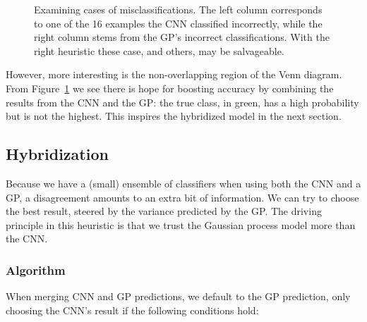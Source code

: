 \documentclass{article}
\begin{document}
\begin{figure}[htb]
\begin{minipage}[c]{.49\hsize}
\end{minipage} %
\caption{Examining cases of misclassifications. The left column corresponds to one of the 16 examples the CNN classified incorrectly, while the right column stems from the GP's incorrect classifications. With the right heuristic these case, and others, may be salvageable.}
\label{fig:mnist:mismatch}
\end{figure}

However, more interesting is the non-overlapping region of the Venn diagram. From Figure~\ref{fig:mnist:mismatch} we see there is hope for boosting accuracy by combining the results from the CNN and the GP: the true class, in green, has a high probability but is not the highest. This inspires the hybridized model in the next section.


\subsection{Hybridization}
\label{sec:mnist:hybridization}

Because we have a (small) ensemble of classifiers when using both the CNN and a GP, a disagreement amounts to an extra bit of information. We can try to choose the best result, steered by the variance predicted by the GP. The driving principle in this heuristic is that we trust the Gaussian process model more than the CNN.

\subsubsection{Algorithm}
\label{sec:mnist:hybridization:criteria}

When merging CNN and GP predictions, we default to the GP prediction, only choosing the CNN's result if the following conditions hold:
\end{document}
